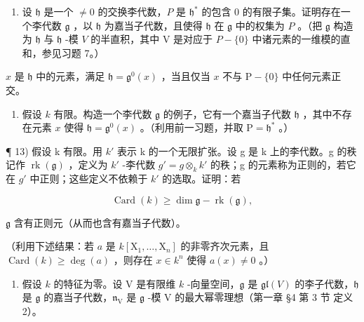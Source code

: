 \begin{enumerate}
\def\labelenumi{\arabic{enumi})}
\setcounter{enumi}{10}
\tightlist
\item
  设 \(\mathfrak{h}\) 是一个 \(\neq 0\) 的交换李代数，\(P\) 是 \(\mathfrak{h}^*\) 的包含 0 的有限子集。证明存在一个李代数 \(\mathfrak{g}\) ，以 \(\mathfrak{h}\) 为嘉当子代数，且使得 \(\mathfrak{h}\) 在 \(\mathfrak{g}\) 中的权集为 \(P\) 。（把 \(\mathfrak{g}\) 构造为 \(\mathfrak{h}\) 与 \(\mathfrak{h}\) -模 \(V\) 的半直积，其中 V 是对应于 \(P - \{0\}\) 中诸元素的一维模的直和，参见习题 7。）
\end{enumerate}

\(x\) 是 \(\mathfrak{h}\) 中的元素，满足 \(\mathfrak{h} = \mathfrak{g}^0(x)\) ，当且仅当 \(x\) 不与 \(\mathrm{P} - \{0\}\) 中任何元素正交。

\begin{enumerate}
\def\labelenumi{\arabic{enumi})}
\setcounter{enumi}{11}
\tightlist
\item
  假设 \(k\) 有限。构造一个李代数 \(\mathfrak{g}\) 的例子，它有一个嘉当子代数 \(\mathfrak{h}\) ，其中不存在元素 \(x\) 使得 \(\mathfrak{h} = \mathfrak{g}^0(x)\) 。（利用前一习题，并取 \(\mathrm{P} = \mathfrak{h}^*\) 。）
\end{enumerate}

¶ 13) 假设 k 有限。用 \(k'\) 表示 k 的一个无限扩张。设 g 是 k 上的李代数。g 的秩记作 \(\operatorname{rk}(\mathfrak{g})\) ，定义为 \(k'\) -李代数 \(g' = g \otimes_{k} k'\) 的秩；g 的元素称为正则的，若它在 \(g'\) 中正则；这些定义不依赖于 \(k'\) 的选取。证明：若

\[
\operatorname{Card} (k) \geq \dim \mathfrak {g} - \operatorname{rk} (\mathfrak {g}),
\]

\(\mathfrak{g}\) 含有正则元（从而也含有嘉当子代数）。

（利用下述结果：若 \(a\) 是 \(k[\mathrm{X}_1, \ldots, \mathrm{X}_n]\) 的非零齐次元素，且 \(\operatorname{Card}(k) \geq \deg(a)\) ，则存在 \(x \in k^n\) 使得 \(a(x) \neq 0\) 。）

\begin{enumerate}
\def\labelenumi{\arabic{enumi})}
\setcounter{enumi}{13}
\tightlist
\item
  假设 \(k\) 的特征为零。设 V 是有限维 \(k\) -向量空间，\(\mathfrak{g}\) 是 \(\mathfrak{gl}(V)\) 的李子代数，\(\mathfrak{h}\) 是 \(\mathfrak{g}\) 的嘉当子代数，\(\mathfrak{n}_{\mathrm{V}}\) 是 \(\mathfrak{g}\) -模 V 的最大幂零理想（第一章 §4 第 3 节 定义 2）。
\end{enumerate}

